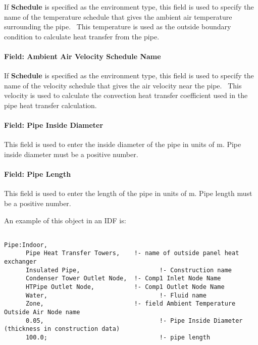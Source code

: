 If \textbf{Schedule} is specified as the environment type, this field is used to specify the name of the temperature schedule that gives the ambient air temperature surrounding the pipe.~ This temperature is used as the outside boundary condition to calculate heat transfer from the pipe.

\paragraph{Field: Ambient Air Velocity Schedule Name}\label{field-ambient-air-velocity-schedule-name}

If \textbf{Schedule} is specified as the environment type, this field is used to specify the name of the velocity schedule that gives the air velocity near the pipe.~ This velocity is used to calculate the convection heat transfer coefficient used in the pipe heat transfer calculation.

\paragraph{Field: Pipe Inside Diameter}\label{field-pipe-inside-diameter-000}

This field is used to enter the inside diameter of the pipe in units of m. Pipe inside diameter must be a positive number.

\paragraph{Field: Pipe Length}\label{field-pipe-length-000}

This field is used to enter the length of the pipe in units of m. Pipe length must be a positive number.

An example of this object in an IDF is:

\begin{lstlisting}

Pipe:Indoor,
      Pipe Heat Transfer Towers,    !- name of outside panel heat exchanger
      Insulated Pipe,                      !- Construction name
      Condenser Tower Outlet Node,  !- Comp1 Inlet Node Name
      HTPipe Outlet Node,           !- Comp1 Outlet Node Name
      Water,                               !- Fluid name
      Zone,                         !- field Ambient Temperature Outside Air Node name
      0.05,                                !- Pipe Inside Diameter (thickness in construction data)
      100.0;                               !- pipe length
\end{lstlisting}

